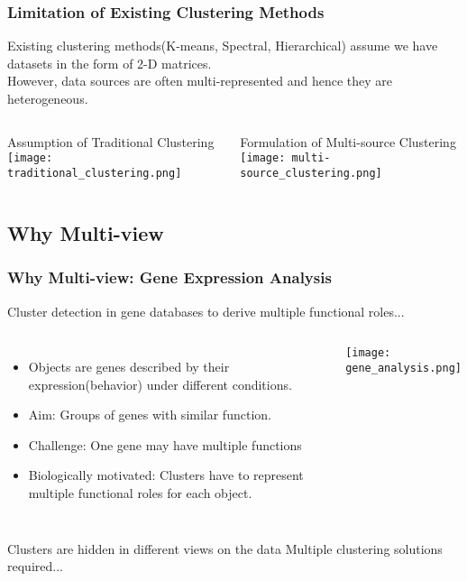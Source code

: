 \documentclass{beamer}
\begin{document}
\begin{frame}
\frametitle{Limitation of Existing Clustering Methods }
\begin{block}{}
Existing clustering methods(K-means, Spectral, Hierarchical) assume we have datasets in the form of 2-D matrices.\\
However, data sources are often multi-represented and hence they are heterogeneous.
\end{block}
	\begin{columns}
	\begin{block}{Assumption of Traditional Clustering}
		\texttt{[image: traditional\_clustering.png]}
	\end{block}
	\begin{block}{Formulation of Multi-source Clustering}
		\texttt{[image: multi-source\_clustering.png]}
	\end{block}
	\end{columns}
\end{frame}

\subsection{Why Multi-view}
\begin{frame}
\frametitle{Why Multi-view: Gene Expression Analysis}
Cluster detection in gene databases to derive multiple functional roles...
	\begin{columns}
	\column{.65\textwidth}
	\begin{itemize}
		\item{Objects are genes described by their expression(behavior) under different conditions.}
		\item{Aim: Groups of genes with similar function.}
		\item{Challenge: One gene may have multiple functions}
		\item{Biologically motivated: Clusters have to represent multiple functional roles for each object.}
	\end{itemize}
	\column{.35\textwidth}
	\texttt{[image: gene\_analysis.png]}
	\end{columns}
\begin{block}{Clusters are hidden in different views on the data}
Multiple clustering solutions required...
\end{block}
\end{frame}
\end{document}

